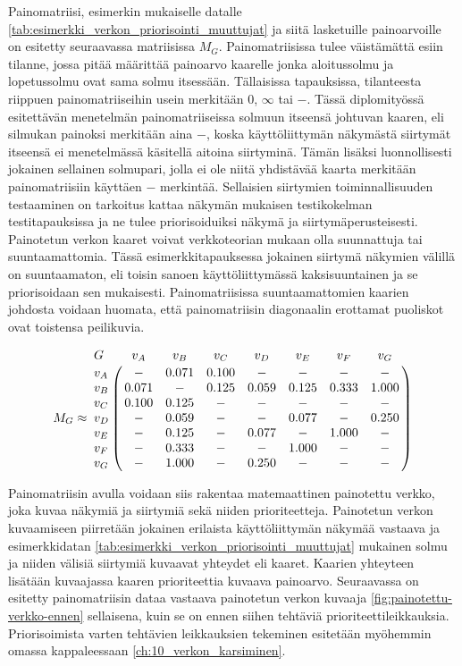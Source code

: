   Painomatriisi, esimerkin mukaiselle datalle \ref{tab:esimerkki_verkon_priorisointi_muuttujat} ja siitä lasketuille painoarvoille on esitetty seuraavassa matriisissa \(M_G\).
  Painomatriisissa tulee väistämättä esiin tilanne, jossa pitää määrittää painoarvo kaarelle jonka aloitussolmu ja lopetussolmu ovat sama solmu itsessään.
  Tällaisissa tapauksissa, tilanteesta riippuen painomatriiseihin usein merkitään \(0\), \(\infty\) tai \(-\).
  Tässä diplomityössä esitettävän menetelmän painomatriiseissa solmuun itseensä johtuvan kaaren, eli silmukan painoksi merkitään aina \(-\), koska käyttöliittymän näkymästä siirtymät itseensä ei menetelmässä käsitellä aitoina siirtyminä.
  Tämän lisäksi luonnollisesti jokainen sellainen solmupari, jolla ei ole niitä yhdistävää kaarta merkitään painomatriisiin käyttäen \(-\) merkintää.
  Sellaisien siirtymien toiminnallisuuden testaaminen on tarkoitus kattaa näkymän mukaisen testikokelman testitapauksissa ja ne tulee priorisoiduiksi näkymä ja siirtymäperusteisesti.
  Painotetun verkon kaaret voivat verkkoteorian mukaan olla suunnattuja tai suuntaamattomia.
  Tässä esimerkkitapauksessa jokainen siirtymä näkymien välillä on suuntaamaton, eli toisin sanoen käyttöliittymässä kaksisuuntainen ja se priorisoidaan sen mukaisesti.
  Painomatriisissa suuntaamattomien kaarien johdosta voidaan huomata, että painomatriisin diagonaalin erottamat puoliskot ovat toistensa peilikuvia.

  \[
    M_G \approx
    \bordermatrix{
      G   & v_A   & v_B   & v_C   & v_D   & v_E   & v_F   & v_G   \cr
      v_A & -     & 0.071 & 0.100 & -     & -     & -     & -     \cr
      v_B & 0.071 & -     & 0.125 & 0.059 & 0.125 & 0.333 & 1.000 \cr
      v_C & 0.100 & 0.125 & -     & -     & -     & -     & -     \cr
      v_D & -     & 0.059 & -     & -     & 0.077 & -     & 0.250 \cr
      v_E & -     & 0.125 & -     & 0.077 & -     & 1.000 & -     \cr
      v_F & -     & 0.333 & -     & -     & 1.000 & -     & -     \cr
      v_G & -     & 1.000 & -     & 0.250 & -     & -     & -     \cr
    }
  \]

  Painomatriisin avulla voidaan siis rakentaa matemaattinen painotettu verkko, joka kuvaa näkymiä ja siirtymiä sekä niiden prioriteetteja.
  Painotetun verkon kuvaamiseen piirretään jokainen erilaista käyttöliittymän näkymää vastaava ja esimerkkidatan \ref{tab:esimerkki_verkon_priorisointi_muuttujat} mukainen solmu ja niiden välisiä siirtymiä kuvaavat yhteydet eli kaaret.
  Kaarien yhteyteen lisätään kuvaajassa kaaren prioriteettia kuvaava painoarvo.
  Seuraavassa on esitetty painomatriisin dataa vastaava painotetun verkon kuvaaja \ref{fig:painotettu-verkko-ennen} sellaisena, kuin se on ennen siihen tehtäviä prioriteettileikkauksia.
  Priorisoimista varten tehtävien leikkauksien tekeminen esitetään myöhemmin omassa kappaleessaan \ref{ch:10_verkon_karsiminen}.

